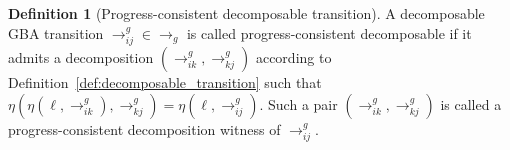\documentclass[lettersize,journal]{IEEEtran}
\theoremstyle{italiclemma}
\theoremstyle{italiclemma}
\theoremstyle{definition}
\newtheorem{definition}{Definition}
\begin{document}
 
\begin{definition}[Progress-consistent decomposable transition]
\label{def:progress_consistent_decomposable_transition}
A decomposable GBA transition $\rightarrow^g_{ij}\in\rightarrow_g$ is called progress-consistent decomposable if it admits a decomposition 
$(\rightarrow^g_{ik},\rightarrow^g_{kj})$ according to
Definition~\ref{def:decomposable_transition} such that
$\eta(\eta(\ell,\rightarrow^g_{ik}),\rightarrow^g_{kj})
=\eta(\ell,\rightarrow^g_{ij})$. Such a pair
$(\rightarrow^g_{ik},\rightarrow^g_{kj})$ is called a progress-consistent decomposition
witness of $\rightarrow^g_{ij}$.
\end{definition}
\end{document}
